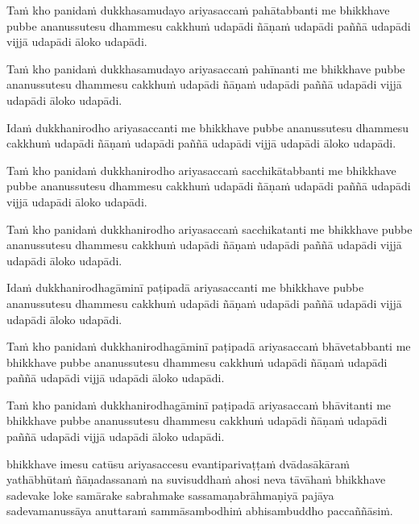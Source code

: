 \begin{pali-hang}
Taṁ kho panidaṁ dukkhasamudayo ariyasaccaṁ pahātabbanti me bhikkhave pubbe ananussutesu dhammesu cakkhuṁ udapādi ñāṇaṁ udapādi paññā udapādi vijjā udapādi āloko udapādi.
\end{pali-hang}

\begin{pali-hang}
Taṁ kho panidaṁ dukkhasamudayo ariyasaccaṁ pahīnanti me bhikkhave pubbe ananussutesu dhammesu cakkhuṁ udapādi ñāṇaṁ udapādi paññā udapādi vijjā udapādi āloko udapādi.
\end{pali-hang}

\begin{pali-hang}
Idaṁ dukkhanirodho ariyasaccanti me bhikkhave pubbe ananussutesu dhammesu cakkhuṁ udapādi ñāṇaṁ udapādi paññā udapādi vijjā udapādi āloko udapādi.
\end{pali-hang}

\begin{pali-hang}
Taṁ kho panidaṁ dukkhanirodho ariyasaccaṁ sacchikātabbanti me bhikkhave pubbe ananussutesu dhammesu cakkhuṁ udapādi ñāṇaṁ udapādi paññā udapādi vijjā udapādi āloko udapādi.
\end{pali-hang}

\begin{pali-hang}
Taṁ kho panidaṁ dukkhanirodho ariyasaccaṁ sacchikatanti me bhikkhave pubbe ananussutesu dhammesu cakkhuṁ udapādi ñāṇaṁ udapādi paññā udapādi vijjā udapādi āloko udapādi.
\end{pali-hang}

\begin{pali-hang}
Idaṁ dukkhanirodhagāminī paṭipadā ariyasaccanti me bhikkhave pubbe ananussutesu dhammesu cakkhuṁ udapādi ñāṇaṁ udapādi paññā udapādi vijjā udapādi āloko udapādi.
\end{pali-hang}

\begin{pali-hang}
Taṁ kho panidaṁ dukkhanirodhagāminī paṭipadā ariyasaccaṁ bhāvetabbanti me bhikkhave pubbe ananussutesu dhammesu cakkhuṁ udapādi ñāṇaṁ udapādi paññā udapādi vijjā udapādi āloko udapādi.
\end{pali-hang}

\begin{pali-hang}
Taṁ kho panidaṁ dukkhanirodhagāminī paṭipadā ariyasaccaṁ bhāvitanti me bhikkhave pubbe ananussutesu dhammesu cakkhuṁ udapādi ñāṇaṁ udapādi paññā udapādi vijjā udapādi āloko udapādi.
\end{pali-hang}

\begin{pali-hang}
 bhikkhave imesu catūsu ariyasaccesu evantiparivaṭṭaṁ dvādasākāraṁ yathābhūtaṁ ñāṇadassanaṁ na suvisuddhaṁ ahosi neva tāvāhaṁ bhikkhave sadevake loke samārake sabrahmake sassamaṇabrāhmaṇiyā pajāya sadevamanussāya anuttaraṁ sammāsambodhiṁ abhisambuddho paccaññāsiṁ.
\end{pali-hang}

